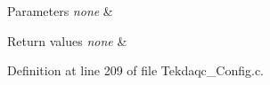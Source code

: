 \begin{DoxyParams}{Parameters}
{\em none} & \\
\hline
\end{DoxyParams}

\begin{DoxyRetVals}{Return values}
{\em none} & \\
\hline
\end{DoxyRetVals}


Definition at line 209 of file Tekdaqc\-\_\-\-Config.\-c.

